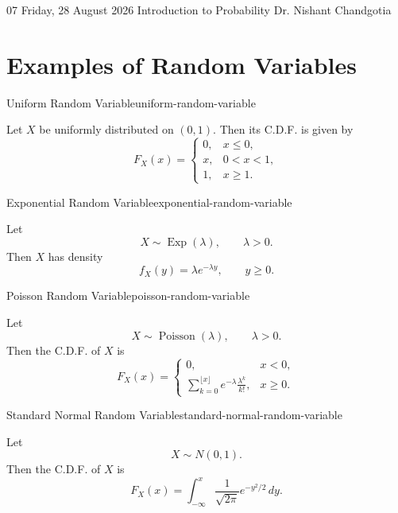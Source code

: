 \lecture
{07}
{Friday, 28 August 2026}
{Introduction to Probability}
{Dr. Nishant Chandgotia}

\section{Examples of Random Variables}

\begin{example}{Uniform Random Variable}{uniform-random-variable}

Let $X$ be uniformly distributed on $(0,1)$. Then its C.D.F. is
given by
\[
F_X(x)
=
\begin{cases}
0, & x\leq 0,\\[4pt]
x, & 0<x<1,\\[4pt]
1, & x\geq 1.
\end{cases}
\]

\end{example}


\begin{example}{Exponential Random Variable}{exponential-random-variable}

Let
\[
X\sim\operatorname{Exp}(\lambda),
\qquad \lambda>0.
\]
Then $X$ has density
\[
f_X(y)=\lambda e^{-\lambda y},
\qquad y\ge 0.
\]

\end{example}


\begin{example}{Poisson Random Variable}{poisson-random-variable}

Let
\[
X\sim\operatorname{Poisson}(\lambda),
\qquad \lambda>0.
\]
Then the C.D.F. of $X$ is
\[
F_X(x)
=
\begin{cases}
0, & x<0,\\[6pt]
\displaystyle
\sum_{k=0}^{\lfloor x\rfloor}
e^{-\lambda}\frac{\lambda^k}{k!},
& x\geq 0.
\end{cases}
\]

\end{example}


\begin{example}{Standard Normal Random Variable}{standard-normal-random-variable}

Let
\[
X\sim N(0,1).
\]
Then the C.D.F. of $X$ is
\[
F_X(x)
=
\int_{-\infty}^{x}
\frac{1}{\sqrt{2\pi}}
e^{-y^2/2}\,dy.
\]

\end{example}


